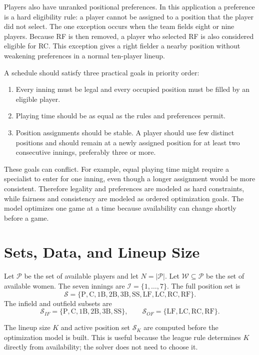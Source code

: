 \documentclass[11pt]{article}
\begin{document}
Players also have unranked positional preferences. In this application a
preference is a hard eligibility rule: a player cannot be assigned to a
position that the player did not select. The one exception occurs when the
team fields eight or nine players. Because RF is then removed, a player who
selected RF is also considered eligible for RC. This exception gives a right
fielder a nearby position without weakening preferences in a normal
ten-player lineup.

A schedule should satisfy three practical goals in priority order:
\begin{enumerate}
    \item Every inning must be legal and every occupied position must be
    filled by an eligible player.
    \item Playing time should be as equal as the rules and preferences permit.
    \item Position assignments should be stable. A player should use few
    distinct positions and should remain at a newly assigned position for at
    least two consecutive innings, preferably three or more.
\end{enumerate}

These goals can conflict. For example, equal playing time might require a
specialist to enter for one inning, even though a longer assignment would be
more consistent. Therefore legality and preferences are modeled as hard
constraints, while fairness and consistency are modeled as ordered
optimization goals. The model optimizes one game at a time because
availability can change shortly before a game.

\section{Sets, Data, and Lineup Size}

Let $\mathcal{P}$ be the set of available players and let
$N=|\mathcal{P}|$. Let $\mathcal{W}\subseteq\mathcal{P}$ be the set of
available women. The seven innings are
$\mathcal{I}=\{1,\ldots,7\}$. The full position set is
\[
\mathcal{S}=\{\mathrm{P,C,1B,2B,3B,SS,LF,LC,RC,RF}\}.
\]
The infield and outfield subsets are
\[
\mathcal{S}_{IF}=\{\mathrm{P,C,1B,2B,3B,SS}\}, \qquad
\mathcal{S}_{OF}=\{\mathrm{LF,LC,RC,RF}\}.
\]

The lineup size $K$ and active position set $\mathcal{S}_K$ are computed
before the optimization model is built. This is useful because the league
rule determines $K$ directly from availability; the solver does not need to
choose it.
\end{document}
